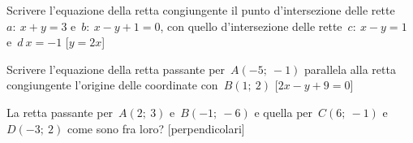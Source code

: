 \begin{esercizio}\label{ese:02_01.}
Scrivere l'equazione della retta congiungente il punto d'intersezione delle 
rette~$a:~x + y = 3$ e~$b:~x - y + 1 = 0$, con quello d'intersezione delle 
rette~$c:~x - y = 1$ e~$d~x = -1$
 \hfill[$y = 2x$]
\end{esercizio}

\begin{esercizio}\label{ese:02_01.}
Scrivere l'equazione della retta passante per~$A(-5;~-1)$ parallela alla retta 
congiungente l'origine delle coordinate con~$B(1;~2)$
 \hfill[$2x - y + 9 = 0$]
\end{esercizio}

\begin{esercizio}\label{ese:02_01.}
La retta passante per~$A(2;~3)$ e~$B(-1;~-6)$ e quella per~$C(6;~-1)$
e~$D(-3;~2)$ come sono fra loro?
 \hfill[perpendicolari]
\end{esercizio}

% 


